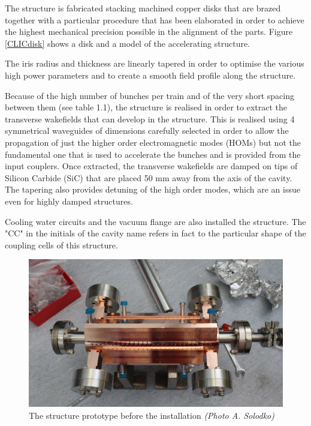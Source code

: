 The structure is fabricated stacking machined copper disks that are brazed together with a particular procedure that has been elaborated in order to achieve the highest mechanical precision possible in the alignment of the parts. Figure \ref{CLICdisk} shows a disk and a model of the accelerating structure.

The iris radius and thickness are linearly tapered in order to optimise the various high power parameters and to create a smooth field profile along the structure. 

Because of the high number of bunches per train and of the very short spacing between them (see table 1.1), the structure is realised in order to extract the transverse wakefields that can develop in the structure. This is realised using 4 symmetrical waveguides of dimensions carefully selected in order to allow the propagation of just the higher order electromagnetic modes (HOMs) but not the fundamental one that is used to accelerate the bunches and is provided from the input couplers. Once extracted, the transverse wakefields are damped on tips of Silicon Carbide (SiC) that are placed 50 mm away from the axis of the cavity.
The tapering also provides detuning of the high order modes, which are an issue even for highly damped structures.

Cooling water circuits and the vacuum flange are also installed the structure. The "CC" in the initials of the cavity name refers in fact to the particular shape of the coupling cells of this structure.

\begin{figure}[h]
\centering

\includegraphics[scale=0.16]{pictures/td26_test_photo}
\caption{The structure prototype before the installation \textit{(Photo A. Solodko)}}
\label{td26_test_photo}

\end{figure}


